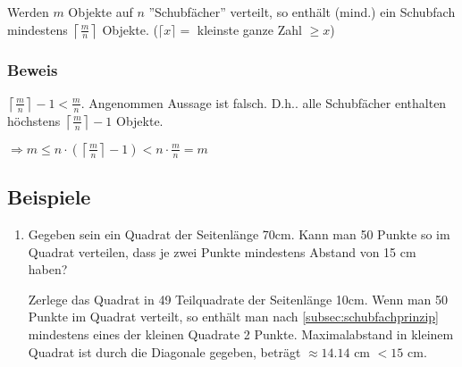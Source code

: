 Werden $m$ Objekte auf $n$ ''Schubfächer'' verteilt, so enthält (mind.) ein Schubfach mindestens $\left\lceil\frac{m}{n}\right\rceil$ Objekte. ($\lceil x \rceil = $ kleinste ganze Zahl $\geq x$)

\subsubsection*{Beweis}

$\left\lceil \frac{m}{n} \right\rceil - 1 < \frac{m}{n}$.
Angenommen Aussage ist falsch. D.h.. alle Schubfächer enthalten höchstens $\left\lceil \frac{m}{n} \right\rceil -1$ Objekte.

$\Rightarrow m \leq n \cdot \left(\left\lceil \frac{m}{n} \right\rceil -1\right) < n \cdot \frac{m}{n} = m $ %


\subsection{Beispiele} %

\begin{enumerate}
	\item Gegeben sein ein Quadrat der Seitenlänge 70cm. Kann man 50 Punkte so im Quadrat verteilen, dass je zwei Punkte mindestens Abstand von 15 cm haben?
	
	Zerlege das Quadrat in 49 Teilquadrate der Seitenlänge 10cm. Wenn man 50 Punkte im Quadrat verteilt, so enthält man nach \ref{subsec:schubfachprinzip} mindestens eines der kleinen Quadrate 2 Punkte.
	Maximalabstand in kleinem Quadrat ist durch die Diagonale gegeben, beträgt $\approx 14.14$ cm $< 15$ cm.
\end{enumerate}
































